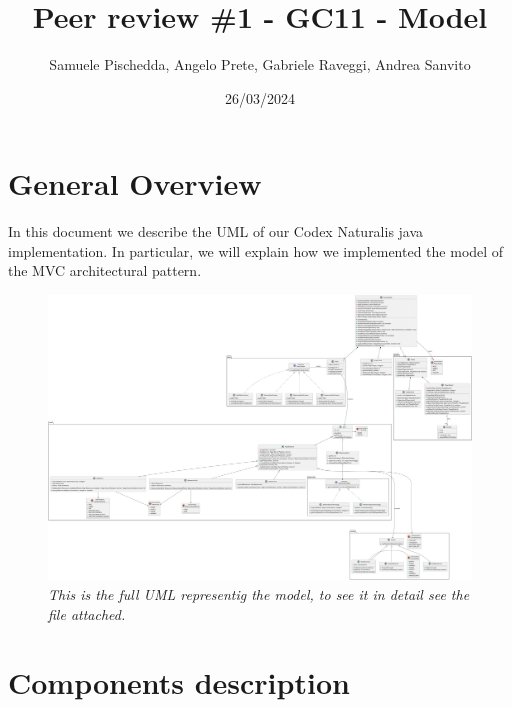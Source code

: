 \documentclass{article}
\title{Peer review \#1 - GC11 - Model}
\author{Samuele Pischedda, Angelo Prete, Gabriele Raveggi, Andrea Sanvito }
\date{26/03/2024}
\begin{document}
\begin{titlepage}
\maketitle
\end{titlepage}

\section*{General Overview}
In this document we describe the UML of our Codex Naturalis java implementation. In particular, we will explain how we implemented the model of the MVC architectural pattern.
\vspace{1cm}
\begin{figure}[h]
    \captionsetup{labelformat=empty}
    \hspace*{-1cm}\includegraphics[scale=0.1]{pngs/model}
    \caption{\textit{This is the full UML representig the model, to see it in detail see the file attached.}}
\end{figure}


\newpage
\section*{Components description}
\setcounter{section}{1}
\end{document}
